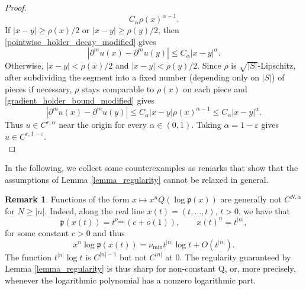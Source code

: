 \documentclass{amsart}
\theoremstyle{plain}
\theoremstyle{definition}
\newtheorem{remark}[theorem]{Remark}
\begin{document}
\begin{proof}
\begin{equation}
        C_\alpha \rho(x)^{\alpha-1}.
\end{equation}
If $|x-y|\geq \rho(x)/2$ or $|x-y|\geq \rho(y)/2$, then
\eqref{pointwise_holder_decay_modified} gives
\begin{equation}
        |\partial^m u(x)-\partial^m u(y)|
        \le
        C_\alpha |x-y|^\alpha.
\end{equation}
Otherwise, $|x-y|<\rho(x)/2$ and $|x-y|<\rho(y)/2$. Since $\rho$ is $\sqrt{|S|}$-Lipschitz, after subdividing the segment into a fixed number (depending only on $|S|$) of pieces if necessary, $\rho$ stays comparable to $\rho(x)$ on each piece
and \eqref{gradient_holder_bound_modified} gives
\begin{equation}
        |\partial^m u(x)-\partial^m u(y)|
        \le
        C_\alpha |x-y|\rho(x)^{\alpha-1}
        \le
        C_\alpha |x-y|^\alpha.
\end{equation}
Thus $u\in C^{r,\alpha}$ near the origin for every $\alpha\in(0,1)$. Taking
$\alpha=1-\varepsilon$ gives $u\in C^{r,1-\varepsilon}$.\\
\end{proof}






In the following, we collect some counterexamples as remarks that show that the assumptions of Lemma \ref{lemma_regularity} cannot be relaxed in general. 

\begin{remark}
Functions of the form $x\mapsto x^n Q(\log\mathfrak{p}(x))$ are generally not $C^{N,\alpha}$ for $N\geq |n|$. Indeed, along the real line $x(t)=(t,\dots,t)$, $t>0$, we have that 
\begin{equation}
    \mathfrak{p}(x(t))=t^{\nu_{\min}}(c+o(1)),\qquad
x(t)^n=t^{|n|}, 
\end{equation}
for some constant $c>0$ and thus
\begin{equation}
x^n\log\mathfrak{p}(x(t))=\nu_{\min} t^{|n|}\log t+O(t^{|n|}).
\end{equation}
The function $t^{|n|}\log t$ is $C^{|n|-1}$ but not $C^{|n|}$ at $0$.  The regularity guaranteed by Lemma \ref{lemma_regularity} is thus sharp for non-constant Q, or, more precisely, whenever the logarithmic polynomial has a nonzero logarithmic part.
\end{remark}
\end{document}
